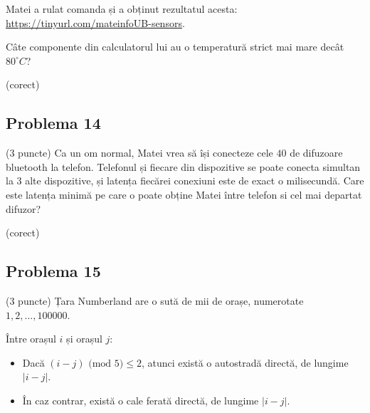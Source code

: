 \documentclass{exam}
\begin{document}
Matei a rulat comanda și a obținut rezultatul acesta: \url{https://tinyurl.com/mateinfoUB-sensors}.

Câte componente din calculatorul lui au o temperatură strict mai mare decât $80^{\circ}C$?



\begin{oneparchoices}
  (corect)
\end{oneparchoices}

\subsection*{Problema 14}

(3 puncte) Ca un om normal, Matei vrea să își conecteze cele $40$ de difuzoare bluetooth la telefon. Telefonul și fiecare din dispozitive se poate conecta simultan la 3 alte dispozitive, și latența fiecărei conexiuni este de exact o milisecundă. Care este latența minimă pe care o poate obține Matei între telefon si cel mai departat difuzor?


\begin{oneparchoices}
  (corect)
\end{oneparchoices}



\subsection*{Problema 15}

(3 puncte) Țara Numberland are o sută de mii de orașe, numerotate $1, 2, \dots, 100000$.


Între orașul $i$ și orașul $j$:
\begin{itemize}
    \item Dacă $(i - j)\textrm{ (mod 5)} \leq 2$, atunci există o autostradă directă, de lungime $|i - j|$.
    \item În caz contrar, există o cale ferată directă, de lungime $|i - j|$. 
\end{itemize}
\end{document}

